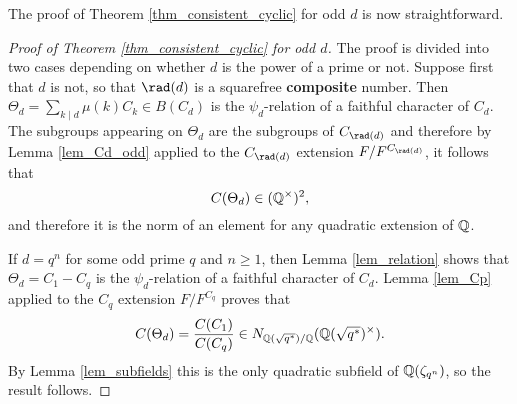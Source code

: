 The proof of Theorem \ref{thm_consistent_cyclic} for odd $d$ is now straightforward.

\begin{proof}[Proof of Theorem \ref{thm_consistent_cyclic} for odd $d$]
    The proof is divided into two cases depending on whether $d$ is the power of a prime or not. Suppose first that $d$ is not, so that $\rad(d)$ is a squarefree \textbf{composite} number. Then $\Theta_d=\sum_{k\mid d}\mu(k)C_k\in B(C_d)$ is the $\psi_d$-relation of a faithful character of $C_d$. The subgroups appearing on $\Theta_d$ are the subgroups of $C_{\rad(d)}$ and therefore by Lemma \ref{lem_Cd_odd} applied to the $C_{\rad(d)}$ extension $F/F^{C_{\rad(d)}}$, it follows that 
    $$C(\Theta_d)\in(\mathbb{Q}^{\times})^2,$$ and therefore it is the norm of an element for any quadratic extension of $\mathbb{Q}$. 

    If $d=q^n$ for some odd prime $q$ and $n\geq1$, then Lemma \ref{lem_relation} shows that $\Theta_d=C_1-C_q$ is the $\psi_d$-relation of a faithful character of $C_d$. Lemma \ref{lem_Cp} applied to the $C_q$ extension $F/F^{C_q}$ proves that 
    $$C(\Theta_d)=\frac{C(C_1)}{C(C_q)}\in N_{\mathbb{Q}(\sqrt{q^*})/\mathbb{Q}}(\mathbb{Q}(\sqrt{q^*})^{\times}).$$ 
    By Lemma \ref{lem_subfields} this is the only quadratic subfield of $\mathbb{Q}(\zeta_{q^n})$, so the result follows.
\end{proof}
